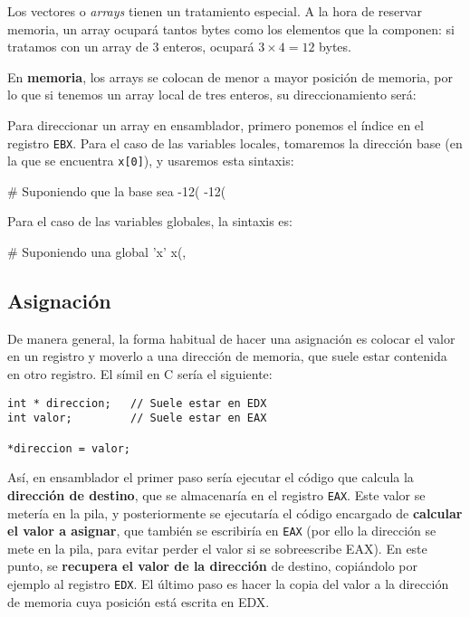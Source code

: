 \documentclass[11pt]{scrartcl}
\begin{document}
Los vectores o \textit{arrays} tienen un tratamiento especial. A la hora de
reservar memoria, un array ocupará tantos bytes como los elementos que la
componen: si tratamos con un array de 3 enteros, ocupará $3 \times 4 = 12$
bytes.

En \textbf{memoria}, los arrays se colocan de menor a mayor posición de memoria,
por lo que si tenemos un array local de tres enteros, su direccionamiento será:

\begin{center}
  \begin{drawstackbare}
     \ebp
     
     
     
  \end{drawstackbare}
\end{center}

Para direccionar un array en ensamblador, primero ponemos el índice en el
registro \texttt{EBX}. Para el caso de las variables locales, tomaremos la
dirección base (en la que se encuentra \texttt{x[0]}), y usaremos esta sintaxis:

\begin{gascode}
  # Suponiendo que la base sea -12(%
  -12(%
\end{gascode}

Para el caso de las variables globales, la sintaxis es:

\begin{gascode}
  # Suponiendo una global 'x'
  x(, %
\end{gascode}

\subsection{Asignación}

De manera general, la forma habitual de hacer una asignación es colocar el valor
en un registro y moverlo a una dirección de memoria, que suele estar contenida
en otro registro. El símil en C sería el siguiente:

\begin{verbatim}
int * direccion;   // Suele estar en EDX
int valor;         // Suele estar en EAX

*direccion = valor;
\end{verbatim}

Así, en ensamblador el primer paso sería ejecutar el código que calcula la
\textbf{dirección de destino}, que se almacenaría en el registro
\texttt{EAX}. Este valor se metería en la pila, y posteriormente se ejecutaría
el código encargado de \textbf{calcular el valor a asignar}, que también se
escribiría en \texttt{EAX} (por ello la dirección se mete en la pila, para
evitar perder el valor si se sobreescribe EAX). En este punto, se
\textbf{recupera el valor de la dirección} de destino, copiándolo por ejemplo al
registro \texttt{EDX}. El último paso es hacer la copia del valor a la dirección
de memoria cuya posición está escrita en EDX.
\end{document}
